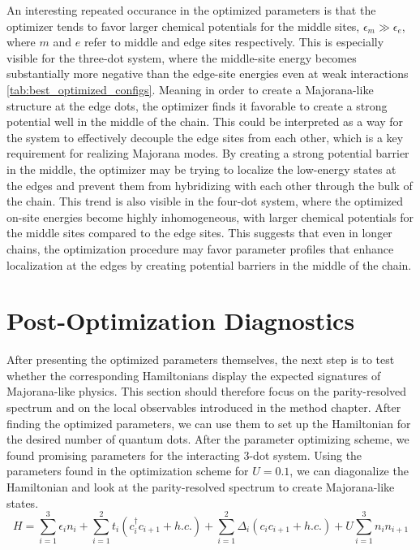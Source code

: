 An interesting repeated occurance in the optimized parameters is that the optimizer tends to favor larger chemical potentials for the middle sites, $ϵ_m ≫ ϵ_e$, where $m$ and $e$ refer to middle and edge sites respectively. This is especially visible for the three-dot system, where the middle-site energy becomes substantially more negative than the edge-site energies even at weak interactions \ref{tab:best_optimized_configs}. Meaning in order to create a Majorana-like structure at the edge dots, the optimizer finds it favorable to create a strong potential well in the middle of the chain. This could be interpreted as a way for the system to effectively decouple the edge sites from each other, which is a key requirement for realizing Majorana modes. By creating a strong potential barrier in the middle, the optimizer may be trying to localize the low-energy states at the edges and prevent them from hybridizing with each other through the bulk of the chain. This trend is also visible in the four-dot system, where the optimized on-site energies become highly inhomogeneous, with larger chemical potentials for the middle sites compared to the edge sites. This suggests that even in longer chains, the optimization procedure may favor parameter profiles that enhance localization at the edges by creating potential barriers in the middle of the chain. 

\section{Post-Optimization Diagnostics}
After presenting the optimized parameters themselves, the next step is to test whether the corresponding Hamiltonians display the expected signatures of Majorana-like physics. This section should therefore focus on the parity-resolved spectrum and on the local observables introduced in the method chapter.
After finding the optimized parameters, we can use them to set up the Hamiltonian for the desired number of quantum dots. After the parameter optimizing scheme, we found promising parameters for the interacting 3-dot system. Using the parameters found in the optimization scheme for $U=0.1$, we can diagonalize the Hamiltonian and look at the parity-resolved spectrum to create Majorana-like states. 
\begin{equation}
  H = \sum_{i=1}^{3} \epsilon_i n_i + \sum_{i=1}^{2} t_i (c_i^\dagger c_{i+1} + h.c.) + \sum_{i=1}^{2} \Delta_i (c_i c_{i+1} + h.c.) + U \sum_{i=1}^{3} n_i n_{i+1}
  \label{eq:3dot_Hamiltonian}
\end{equation}

